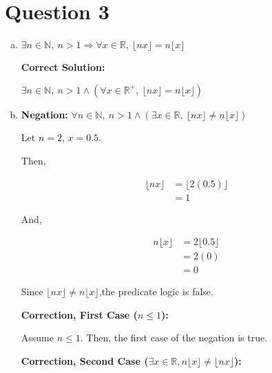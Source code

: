 \documentclass[12pt]{article}
\begin{document}
\section*{Question 3}
\begin{enumerate}[a.]
    \item

    $\exists n \in \mathbb{N},\: n > 1 \Rightarrow \forall x \in \mathbb{R},\:
    \lfloor nx \rfloor = n \lfloor x \rfloor$

    \bigskip

    \textbf{Correct Solution:}

    $\exists n \in \mathbb{N},\:n>1 \land (\forall x \in \mathbb{R}^{+},\:
    \lfloor nx \rfloor = n \lfloor x \rfloor)$

    \item

    \textbf{Negation:} $\forall n \in \mathbb{N},\: n > 1 \land (\exists x \in
    \mathbb{R},\: \lfloor nx \rfloor \neq n \lfloor x \rfloor)$

    \bigskip

    Let $n = 2$, $x = 0.5$.

    \bigskip

    Then,

    \begin{align}
        \lfloor nx \rfloor &= \lfloor 2(0.5) \rfloor\\
        &= 1
    \end{align}

    And,

    \begin{align}
        n \lfloor x \rfloor &= 2 \lfloor 0.5 \rfloor\\
        &= 2(0)\\
        &= 0
    \end{align}

    Since $\lfloor nx \rfloor \neq n \lfloor x \rfloor$,the predicate logic is
    false.

    \bigskip

    \textbf{Correction, First Case ($n \leq 1$):}

    \bigskip

    Assume $n \leq 1$. Then, the first case of the negation is true.

    \bigskip

    \textbf{Correction, Second Case ($\exists x \in \mathbb{R}, n \lfloor x \rfloor
    \neq \lfloor nx \rfloor$):}

    \bigskip


\end{enumerate}
\end{document}
